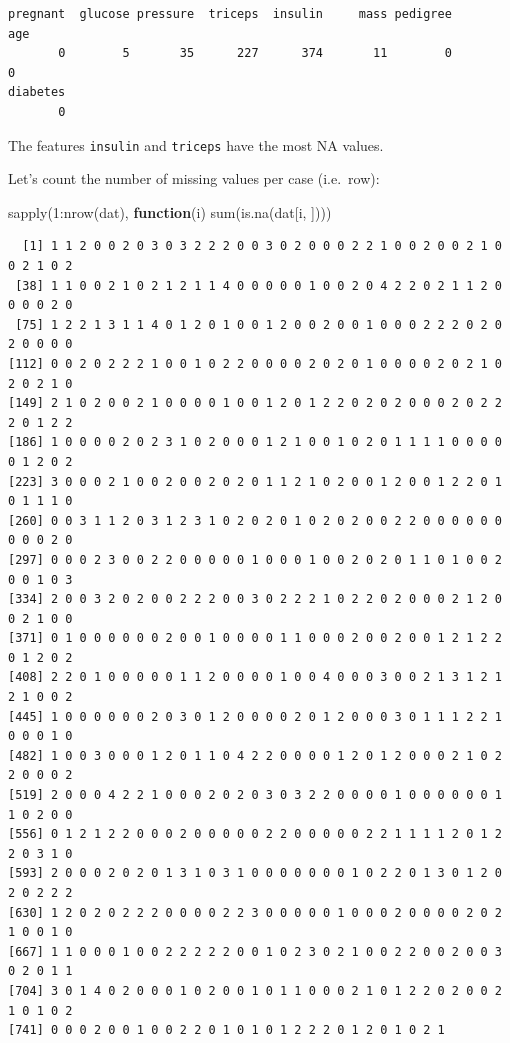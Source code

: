 \documentclass[
]{book}
\newenvironment{Shaded}{\begin{snugshade}}{\end{snugshade}}
\newcommand{\ControlFlowTok}[1]{\textcolor[rgb]{0.13,0.29,0.53}{\textbf{#1}}}
\newcommand{\DecValTok}[1]{\textcolor[rgb]{0.00,0.00,0.81}{#1}}
\newcommand{\FunctionTok}[1]{\textcolor[rgb]{0.00,0.00,0.00}{#1}}
\newcommand{\NormalTok}[1]{#1}
\newcommand{\SpecialCharTok}[1]{\textcolor[rgb]{0.00,0.00,0.00}{#1}}
\begin{document}
\begin{verbatim}
pregnant  glucose pressure  triceps  insulin     mass pedigree      age 
       0        5       35      227      374       11        0        0 
diabetes 
       0 
\end{verbatim}

The features \texttt{insulin} and \texttt{triceps} have the most NA values.

Let's count the number of missing values per case (i.e.~row):

\begin{Shaded}
\begin{Highlighting}[]
\FunctionTok{sapply}\NormalTok{(}\DecValTok{1}\SpecialCharTok{:}\FunctionTok{nrow}\NormalTok{(dat), }\ControlFlowTok{function}\NormalTok{(i) }\FunctionTok{sum}\NormalTok{(}\FunctionTok{is.na}\NormalTok{(dat[i, ])))}
\end{Highlighting}
\end{Shaded}

\begin{verbatim}
  [1] 1 1 2 0 0 2 0 3 0 3 2 2 2 0 0 3 0 2 0 0 0 2 2 1 0 0 2 0 0 2 1 0 0 2 1 0 2
 [38] 1 1 0 0 2 1 0 2 1 2 1 1 4 0 0 0 0 0 1 0 0 2 0 4 2 2 0 2 1 1 2 0 0 0 0 2 0
 [75] 1 2 2 1 3 1 1 4 0 1 2 0 1 0 0 1 2 0 0 2 0 0 1 0 0 0 2 2 2 0 2 0 2 0 0 0 0
[112] 0 0 2 0 2 2 2 1 0 0 1 0 2 2 0 0 0 0 2 0 2 0 1 0 0 0 0 2 0 2 1 0 2 0 2 1 0
[149] 2 1 0 2 0 0 2 1 0 0 0 0 1 0 0 1 2 0 1 2 2 0 2 0 2 0 0 0 2 0 2 2 2 0 1 2 2
[186] 1 0 0 0 0 2 0 2 3 1 0 2 0 0 0 1 2 1 0 0 1 0 2 0 1 1 1 1 0 0 0 0 0 1 2 0 2
[223] 3 0 0 0 2 1 0 0 2 0 0 2 0 2 0 1 1 2 1 0 2 0 0 1 2 0 0 1 2 2 0 1 0 1 1 1 0
[260] 0 0 3 1 1 2 0 3 1 2 3 1 0 2 0 2 0 1 0 2 0 2 0 0 2 2 0 0 0 0 0 0 0 0 0 2 0
[297] 0 0 0 2 3 0 0 2 2 0 0 0 0 0 1 0 0 0 1 0 0 2 0 2 0 1 1 0 1 0 0 2 0 0 1 0 3
[334] 2 0 0 3 2 0 2 0 0 2 2 2 0 0 3 0 2 2 2 1 0 2 2 0 2 0 0 0 2 1 2 0 0 2 1 0 0
[371] 0 1 0 0 0 0 0 0 2 0 0 1 0 0 0 0 1 1 0 0 0 2 0 0 2 0 0 1 2 1 2 2 0 1 2 0 2
[408] 2 2 0 1 0 0 0 0 0 1 1 2 0 0 0 0 1 0 0 4 0 0 0 3 0 0 2 1 3 1 2 1 2 1 0 0 2
[445] 1 0 0 0 0 0 0 2 0 3 0 1 2 0 0 0 0 2 0 1 2 0 0 0 3 0 1 1 1 2 2 1 0 0 0 1 0
[482] 1 0 0 3 0 0 0 1 2 0 1 1 0 4 2 2 0 0 0 0 1 2 0 1 2 0 0 0 2 1 0 2 2 0 0 0 2
[519] 2 0 0 0 4 2 2 1 0 0 0 2 0 2 0 3 0 3 2 2 0 0 0 0 1 0 0 0 0 0 0 1 1 0 2 0 0
[556] 0 1 2 1 2 2 0 0 0 2 0 0 0 0 0 2 2 0 0 0 0 0 2 2 1 1 1 1 2 0 1 2 2 0 3 1 0
[593] 2 0 0 0 2 0 2 0 1 3 1 0 3 1 0 0 0 0 0 0 0 1 0 2 2 0 1 3 0 1 2 0 2 0 2 2 2
[630] 1 2 0 2 0 2 2 2 0 0 0 0 2 2 3 0 0 0 0 0 1 0 0 0 2 0 0 0 0 2 0 2 1 0 0 1 0
[667] 1 1 0 0 0 1 0 0 2 2 2 2 2 0 0 1 0 2 3 0 2 1 0 0 2 2 0 0 2 0 0 3 0 2 0 1 1
[704] 3 0 1 4 0 2 0 0 0 1 0 2 0 0 1 0 1 1 0 0 0 2 1 0 1 2 2 0 2 0 0 2 1 0 1 0 2
[741] 0 0 0 2 0 0 1 0 0 2 2 0 1 0 1 0 1 2 2 2 0 1 2 0 1 0 2 1
\end{verbatim}
\end{document}

